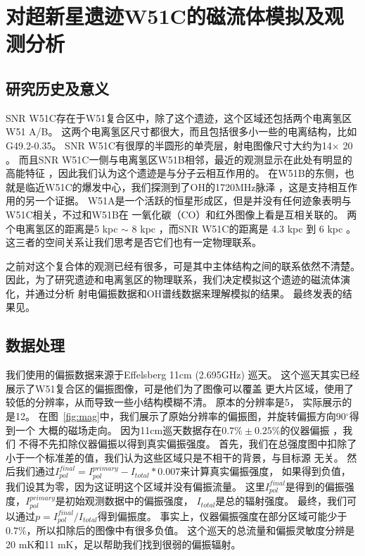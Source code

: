 \chapter{对超新星遗迹W51C的磁流体模拟及观测分析}
\label{W51C}



\section{研究历史及意义}
\label{W51Cintro}
SNR W51C存在于W51复合区中，除了这个遗迹，这个区域还包括两个电离氢区W51 A/B。
这两个电离氢区尺寸都很大，而且包括很多小一些的电离结构，比如G49.2-0.35。
SNR W51C有很厚的半圆形的单壳层，射电图像尺寸大约为14\am $\times$ 20\am
\citep{Copetti1991,Subrahmanyan1995}。
而且SNR W51C一侧与电离氢区W51B相邻，最近的观测显示在此处有明显的高能特征
\citep{Abdo2009,Aleksic2012}，因此我们认为这个遗迹是与分子云相互作用的。
在W51B的东侧，也就是临近W51C的爆发中心，我们探测到了OH的1720MHz脉泽
\citep{Hewitt2008,Brogan2013}，这是支持相互作用的另一个证据。
W51A是一个活跃的恒星形成区，但是并没有任何迹象表明与W51C相关，不过和W51B在
一氧化碳（CO）和红外图像上看是互相关联的\citep{Kang2010,Parsons2012,Ginsburg2015}。
两个电离氢区的距离是5 kpc $\sim$ 8 kpc
\citep{Genzel1981,Schneps1981,Xu2009,Sato2010,Tian2013}，而SNR W51C的距离是
4.3 kpc \citep{Tian2013} 到 6 kpc \citep{Koo1995}。
这三者的空间关系让我们思考是否它们也有一定物理联系。

之前对这个复合体的观测已经有很多，可是其中主体结构之间的联系依然不清楚。
因此，为了研究遗迹和电离氢区的物理联系，我们决定模拟这个遗迹的磁流体演化，并通过分析
射电偏振数据和OH谱线数据来理解模拟的结果。
最终发表的结果见\citet{Zhang2017}。

\section{数据处理}
\label{W51Cdata}

我们使用的偏振数据来源于Effelsberg 11cm (2.695GHz) 巡天\citep{1999A&A...350..447D}。
这个巡天其实已经展示了W51复合区的偏振图像，可是他们为了图像可以覆盖
更大片区域，使用了较低的分辨率，从而导致一些小结构模糊不清。
原本的分辨率是5\am， 实际展示的是12\am。
在图~\ref{fig:mag}中，我们展示了原始分辨率的偏振图，并旋转偏振方向90$^{\circ}$得到一个
大概的磁场走向。
因为11cm巡天数据存在$0.7\% \pm 0.25\%$的仪器偏振 \citep{1987A&AS...69..451J}，我们
不得不先扣除仪器偏振以得到真实偏振强度。
首先，我们在总强度图中扣除了小于一个标准差的值，我们认为这些区域只是不相干的背景，与目标源
无关。
然后我们通过$I^{final}_{pol}=I^{primary}_{pol}-I_{total}*0.007$来计算真实偏振强度，
如果得到负值，我们设其为零，因为这证明这个区域并没有偏振流量。
这里$I^{final}_{pol}$是得到的偏振强度，$I^{primary}_{pol}$是初始观测数据中的偏振强度，
$I_{total}$是总的辐射强度。
最终，我们可以通过$p=I^{final}_{pol}/I_{total}$得到偏振度。
事实上，仪器偏振强度在部分区域可能少于$0.7\%$，所以扣除后的图像中有很多负值。
这个巡天的总流量和偏振灵敏度分辨是20 mK和11 mK，足以帮助我们找到很弱的偏振辐射。

